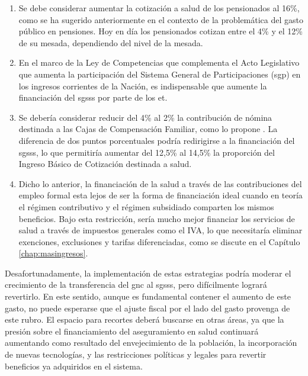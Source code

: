 \begin{enumerate}
    \item Se debe considerar aumentar la cotización a salud de los pensionados al 16\%, como se ha sugerido anteriormente en el contexto de la problemática del gasto público en pensiones. Hoy en día los pensionados cotizan entre el 4\% y el 12\% de su mesada, dependiendo del nivel de la mesada.
    
    \item En el marco de la Ley de Competencias que complementa el Acto Legislativo que aumenta la participación del Sistema General de Participaciones (\gls{sgp}) en los ingresos corrientes de la Nación, es indispensable que aumente la financiación del \gls{sgsss} por parte de los \gls{et}. 
    \item Se debería considerar reducir del 4\% al 2\% la contribución de nómina destinada a las Cajas de Compensación Familiar, como lo propone \cite{Hofstetter2014}. La diferencia de dos puntos porcentuales podría redirigirse a la financiación del \gls{sgsss}, lo que permitiría aumentar del 12,5\% al 14,5\% la proporción del Ingreso Básico de Cotización destinada a salud. 
    \item Dicho lo anterior, la financiación de la salud a través de las contribuciones del empleo formal esta lejos de ser la forma de financiación ideal cuando en teoría el régimen contributivo y el régimen subsidiado comparten los mismos beneficios. Bajo esta restricción, sería mucho mejor financiar los servicios de salud a través de impuestos generales como el IVA, lo que necesitaría eliminar exenciones, exclusiones y tarifas diferenciadas, como se discute en el Capítulo \ref{chap:masingresos}.
\end{enumerate}

Desafortunadamente, la implementación de estas estrategias podría moderar el crecimiento de la transferencia del \gls{gnc} al \gls{sgsss}, pero difícilmente logrará revertirlo. En este sentido, aunque es fundamental contener el aumento de este gasto, no puede esperarse que el ajuste fiscal por el lado del gasto provenga de este rubro. El espacio para recortes deberá buscarse en otras áreas, ya que la presión sobre el financiamiento del aseguramiento en salud continuará aumentando como resultado del envejecimiento de la población, la incorporación de nuevas tecnologías, y las restricciones políticas y legales para revertir beneficios ya adquiridos en el sistema.

